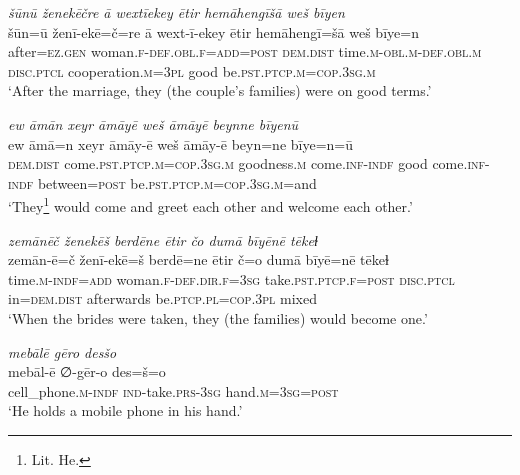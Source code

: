 \ea \label{RE.22}
\textit{šūnū ženekēčre ā wextīekey ētir hemāhengīšā weš bīyen} \\ 
\gll šūn=ū ženī-ekē=č=re ā wext-ī-ekey ētir hemāhengī=šā weš bīye=n \\ 
 after\textsc{=ez.gen} woman\textsc{.f}\textsc{-def}\textsc{.obl}\textsc{.f}\textsc{=add}\textsc{=\textsc{post}} \textsc{dem.dist} time\textsc{.m}\textsc{-obl}\textsc{.m}\textsc{-def}\textsc{.obl}\textsc{.m} \textsc{disc.ptcl} cooperation\textsc{.m}\textsc{=3pl} good be\textsc{.pst}\textsc{.ptcp}\textsc{.m}\textsc{=cop}\textsc{.3sg}\textsc{.m} \\ 
\glt `After the marriage, they (the couple's families) were on good terms.'
\z 
 
\ea \label{RE.25}
\textit{ew āmān xeyr āmāyē weš āmāyē beynne bīyenū} \\ 
\gll ew āmā=n xeyr āmāy-ē weš āmāy-ē beyn=ne bīye=n=ū \\ 
 \textsc{dem.dist} come\textsc{.pst}\textsc{.ptcp}\textsc{.m}\textsc{=cop}\textsc{.3sg}\textsc{.m} goodness\textsc{.m} come\textsc{.inf}\textsc{-indf} good come\textsc{.inf}\textsc{-indf} between\textsc{=\textsc{post}} be\textsc{.pst}\textsc{.ptcp}\textsc{.m}\textsc{=cop}\textsc{.3sg}\textsc{.m}=and \\ 
\glt `They\footnote{Lit. He.} would come and greet each other and welcome each other.'
\z 
 
\ea \label{RE.26}
\textit{zemānēč ženekēš berdēne ētir čo dumā bīyēnē tēkeɫ} \\ 
\gll zemān-ē=č ženī-ekē=š berdē=ne ētir č=o dumā bīyē=nē tēkeɫ \\ 
 time\textsc{.m}\textsc{-indf}\textsc{=add} woman\textsc{.f}\textsc{-def}\textsc{.dir}\textsc{.f}\textsc{=3sg} take\textsc{.pst}\textsc{.ptcp}\textsc{.f}\textsc{=\textsc{post}} \textsc{disc.ptcl} in=\textsc{dem.dist} afterwards be\textsc{.ptcp}\textsc{.pl}\textsc{=cop}\textsc{.3pl} mixed \\ 
\glt `When the brides were taken, they (the families) would become one.'
\z 
 
\ea \label{RE.30}
\textit{mebālē gēro desšo} \\ 
\gll mebāl-ē ∅-gēr-o des=š=o \\ 
 cell\_phone\textsc{.m}\textsc{-indf} \textsc{ind-}take\textsc{.prs}\textsc{-3sg} hand\textsc{.m}\textsc{=3sg}\textsc{=\textsc{post}} \\ 
\glt `He holds a mobile phone in his hand.'
\z 
 
